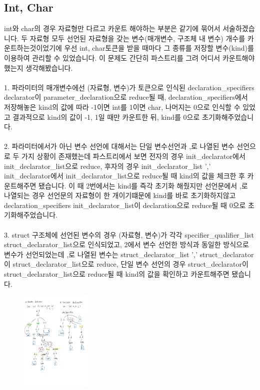 \documentclass{article}
\begin{document}
        \subsection{Int, Char}
            int와 char의 경우 자료형만 다르고 카운트 해야하는 부분은 같기에 묶어서 서술하겠습니다. 두 자료형 모두 선언된 자료형을 갖는 변수(매개변수, 구조체 내 변수) 개수를 카운트하는것이었기에
            우선 int, char토큰을 받을 때마다 그 종류를 저장할 변수(kind)를 이용하여 관리할 수 있었습니다. 이 문제도 간단히 파스트리를 그려 어디서 카운트해야했는지 생각해봤습니다.\\\\
            1. 파라미터의 매개변수에선 (자료형, 변수)가 토큰으로 인식된 declaration\_specifiers declarator이 parameter\_declaration으로 reduce될 때, declaration\_specifiers에서 저장해놓은 
            kind의 값에 따라 -1이면 int를 1이면 char, 나머지는 0으로 인식할 수 있었고 결과적으로 kind의 값이 -1, 1일 때만 카운트한 뒤, kind를 0으로 초기화해주었습니다.\\\\
            2. 파라미터에서가 아닌 변수 선언에 대해서는 단일 변수선언과 ,로 나열된 변수 선언으로 두 가지 상황이 존재했는데 파스트리에서 보면 전자의 경우 init\_declarator에서 init\_declarator\_list으로
            reduce, 후자의 경우 init\_declarator\_list ',' init\_declarator에서 init\_declarator\_list으로 reduce될 때 kind의 값을 체크한 후 카운트해주면 됐습니다. 이 때 2번에서는 kind를 즉각 초기화
            해줬지만 선언문에서 ,로 나열되는 경우 선언문의 자료형이 한 개이기떄문에 kind를 바로 초기화하지않고 declaration\_specifiers init\_declarator\_list이 declaration으로 reduce될 때 0으로 초기화해주었습니다.\\\\
            3. struct 구조체에 선언된 변수의 경우 (자료형, 변수)가 각각 specifier\_qualifier\_list struct\_declarator\_list으로 인식되었고, 2에서 변수 선언한 방식과 동일한 방식으로 변수가 선언되었는데
            ,로 나열된 변수는 struct\_declarator\_list ',' struct\_declarator 이 struct\_declarator\_list으로 reduce, 단일 변수 선언의 경우 struct\_declarator이 struct\_declarator\_list으로 reduce될 때 
            kind의 값을 확인하고 카운트해주면 됐습니다.\\
            \newpage
        \begin{figure}[h]
            \includegraphics[width = 0.3\textwidth]{func_vari_def.jpg}
        \end{figure}
        
\end{document}
